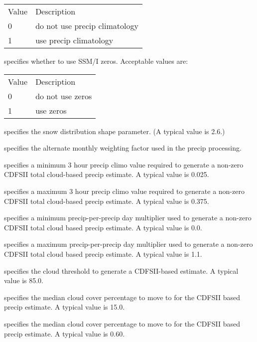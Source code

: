  \begin{tabular}{ll}
 Value & Description                   \\
 0     & do not use precip climatology \\
 1     & use precip climatology        \\
 \end{tabular}

  specifies whether to use
 SSM/I zeros.
 Acceptable values are:

 \begin{tabular}{ll}
 Value & Description      \\
 0     & do not use zeros \\
 1     & use zeros        \\
 \end{tabular}

  specifies the snow
 distribution shape parameter. (A typical value is 2.6.)

  specifies
 the alternate monthly weighting factor used in the precip processing.

  specifies a minimum 3 hour 
 precip climo value required to generate a non-zero CDFSII total
 cloud-based precip estimate. A typical value is 0.025.

  specifies a maximum 3 hour
 precip climo value required to generate a non-zero CDFSII total
 cloud-based precip estimate. A typical value is 0.375.

  specifies a
 minimum precip-per-precip day multiplier used to generate a non-zero
 CDFSII total cloud based precip estimate. A typical value is 0.0.

  specifies a
 maximum precip-per-precip day multiplier used to generate a non-zero
 CDFSII total cloud based precip estimate. A typical value is 1.1.

 specifies the cloud threshold to generate a CDFSII-based estimate. A
 typical value is 85.0.

  specifies the median
 cloud cover percentage to move to for the CDFSII based precip estimate. 
 A typical value is 15.0.

  specifies the median
 cloud cover percentage to move to for the CDFSII based precip 
 estimate. A typical value is 0.60.


